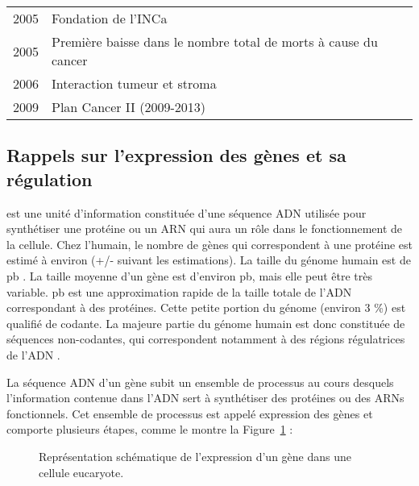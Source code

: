\begin{table}
\begin{center}
\begin{tabular}{cl}
						2005          & Fondation de l'\ac{INCa}                                                                \\
						2005          & Première baisse dans le nombre total de morts à cause du cancer                         \\
						2006          & Interaction tumeur et stroma                                                            \\
						2009          & Plan Cancer II (2009-2013)                                                              \\
						\bottomrule
					\end{tabular}
					\label{tab:Devita2012}
				\end{center}
			\end{table}

		\subsection{\textcolor{red!45!black}{Rappels sur l'expression des gènes et sa régulation}}\label{sub:RappelsExpression}
			 est une unité d'information constituée d'une séquence \acs{ADN} utilisée pour synthétiser une protéine ou un \acs{ARN} qui aura un rôle dans le fonctionnement de la cellule.
			Chez l'humain, le nombre de gènes qui correspondent à une protéine est estimé à environ  \citep{HGP2001} (+/-  suivant les estimations).
			La taille du génome humain est de  \ac{pb} \citep{HGP2001}.
			La taille moyenne d'un gène est d'environ  \ac{pb}, mais elle peut être très variable.
			 \ac{pb} est une approximation rapide de la taille totale de l'\acs{ADN} correspondant à des protéines.
			Cette petite portion du génome (environ 3 \%) est qualifié de codante.
			La majeure partie du génome humain est donc constituée de séquences non-codantes, qui correspondent notamment à des régions régulatrices de l'ADN \citep{ENCODE2012}.

			La séquence \acs{ADN} d'un gène subit un ensemble de processus au cours desquels l'information contenue dans l'\acs{ADN} sert à synthétiser des protéines ou des \acsp{ARN} fonctionnels.
			Cet ensemble de processus est appelé expression des gènes et comporte plusieurs étapes, comme le montre la Figure~\ref{fig:Expression} :
			\begin{figure}
				\begin{center}
					\def\svgwidth{.8\columnwidth}
					\caption{Représentation schématique de l'expression d'un gène dans une cellule eucaryote.}
					\label{fig:Expression}
				\end{center}
			\end{figure}

